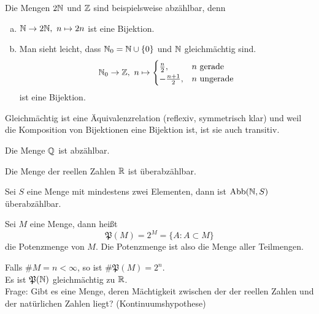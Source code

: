     \begin{bem}
        Die Mengen $2\mathbb{N}$ und $\mathbb{Z}$ sind beispielsweise abzählbar, denn 
        \begin{enumerate}[(a)]
            \item $\mathbb{N} \to 2\mathbb{N}, \ n\mapsto 2n$ ist eine Bijektion.
            \item Man sieht leicht, dass $\mathbb{N}_0=\mathbb{N}\cup \{0\}$ und $\mathbb{N}$ gleichmächtig sind.
            \[
            \mathbb{N}_0 \to \mathbb{Z}, \ n \mapsto 
            \begin{cases}
            \frac{n}{2}, & n \text{ gerade} \\
            -\frac{n+1}{2}, & n \text{ ungerade}    
            \end{cases}     
            \] ist eine Bijektion.
        \end{enumerate}
        Gleichmächtig ist eine Äquivalenzrelation (reflexiv, symmetrisch klar) und weil die Komposition von Bijektionen eine 
        Bijektion ist, ist sie auch transitiv. 
    \end{bem}
    \begin{satz}
        Die Menge $\mathbb{Q}$ ist abzählbar.
    \end{satz}
    \begin{satz}
        Die Menge der reellen Zahlen $\mathbb{R}$ ist überabzählbar.
    \end{satz}
    \begin{lemma}
        Sei $S$ eine Menge mit mindestens zwei Elementen, dann ist $\operatorname{Abb}(\mathbb{N},S)$ überabzählbar.
    \end{lemma}
    \begin{defn}
        Sei $M$ eine Menge, dann heißt 
        \[
        \mathfrak{P}(M) = 2^M = \{A:A\subset M\}    
        \] die Potenzmenge von $M$. Die Potenzmenge ist also die Menge aller Teilmengen.
    \end{defn}
    \begin{bem}
        Falls $\# M =n < \infty$, so ist $\# \mathfrak{P}(M) = 2^n$. \\
        Es ist $\mathfrak{P}(\mathbb{N})$ gleichmächtig zu $\mathbb{R}$. \\
        Frage: Gibt es eine Menge, deren Mächtigkeit zwischen der der reellen Zahlen und der natürlichen Zahlen liegt? (Kontinuumshypothese)
    \end{bem}